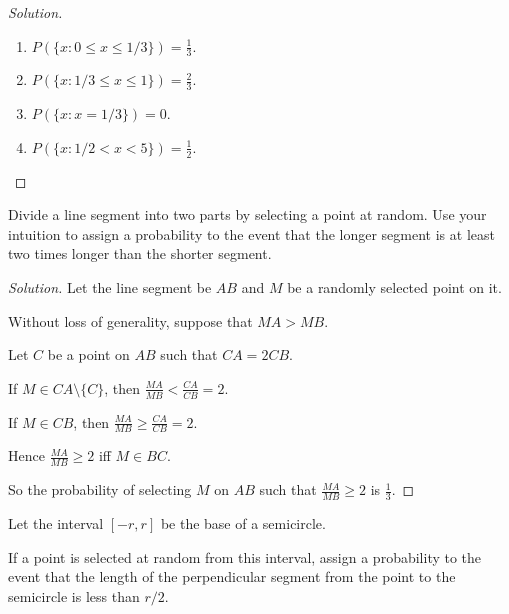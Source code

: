 \documentclass[class=probandstats,crop=false]{standalone}
\begin{document}
\begin{proof}[Solution]
    \begin{enumerate}[label = \textbf{(\alph*)}]
        \item $P(\{ x: 0\le x\le 1/3 \}) = \frac{1}{3}$.
        \item $P(\{ x: 1/3\le x\le 1 \}) = \frac{2}{3}$.
        \item $P(\{ x: x = 1/3 \}) = 0$.
        \item $P(\{ x: 1/2 < x < 5 \}) = \frac{1}{2}$.
    \end{enumerate}
\end{proof}

\begin{exercise}
    \par Divide a line segment into two parts by selecting a point at random. Use your intuition to assign a probability to the event that the longer segment is at least two times longer than the shorter segment.
\end{exercise}

\begin{proof}[Solution]
    \par Let the line segment be $AB$ and $M$ be a randomly selected point on it.
    \par Without loss of generality, suppose that $MA > MB$.
    \par Let $C$ be a point on $AB$ such that $CA = 2CB$.
    \par If $M\in CA\setminus\{ C \}$, then $\frac{MA}{MB} < \frac{CA}{CB} = 2$.
    \par If $M\in CB$, then $\frac{MA}{MB}\ge \frac{CA}{CB} = 2$.
    \par Hence $\frac{MA}{MB}\ge 2$ iff $M\in BC$.
    \par So the probability of selecting $M$ on $AB$ such that $\frac{MA}{MB}\ge 2$ is $\frac{1}{3}$.
\end{proof}

\begin{exercise}
    \par Let the interval $[-r, r]$ be the base of a semicircle.
    \par If a point is selected at random from this interval, assign a probability to the event that the length of the perpendicular segment from the point to the semicircle is less than $r/2$.
\end{exercise}
\end{document}
